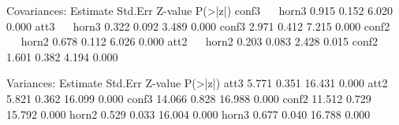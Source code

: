 \begin{Schunk}
\begin{Soutput}
Covariances:
                   Estimate  Std.Err  Z-value  P(>|z|)
  conf3 ~~                                            
    horn3             0.915    0.152    6.020    0.000
  att3 ~~                                             
    horn3             0.322    0.092    3.489    0.000
    conf3             2.971    0.412    7.215    0.000
  conf2 ~~                                            
    horn2             0.678    0.112    6.026    0.000
  att2 ~~                                             
    horn2             0.203    0.083    2.428    0.015
    conf2             1.601    0.382    4.194    0.000

Variances:
                   Estimate  Std.Err  Z-value  P(>|z|)
    att3              5.771    0.351   16.431    0.000
    att2              5.821    0.362   16.099    0.000
    conf3            14.066    0.828   16.988    0.000
    conf2            11.512    0.729   15.792    0.000
    horn2             0.529    0.033   16.004    0.000
    horn3             0.677    0.040   16.788    0.000


\end{Soutput}
\end{Schunk}
